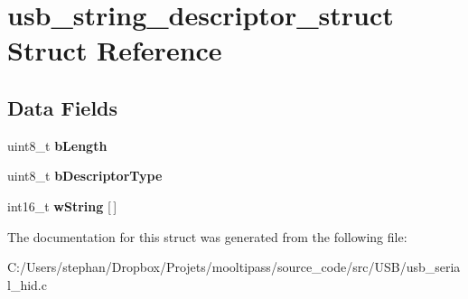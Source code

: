 \hypertarget{structusb__string__descriptor__struct}{\section{usb\-\_\-string\-\_\-descriptor\-\_\-struct Struct Reference}
\label{structusb__string__descriptor__struct}
}
\subsection*{Data Fields}
\begin{DoxyCompactItemize}
\item 
\hypertarget{structusb__string__descriptor__struct_a1deca1f1d6e5815b290e6e1015bce5b8}{uint8\-\_\-t {\bfseries b\-Length}}\label{structusb__string__descriptor__struct_a1deca1f1d6e5815b290e6e1015bce5b8}

\item 
\hypertarget{structusb__string__descriptor__struct_a67d7027b9eb9ed268d28e84fbc675707}{uint8\-\_\-t {\bfseries b\-Descriptor\-Type}}\label{structusb__string__descriptor__struct_a67d7027b9eb9ed268d28e84fbc675707}

\item 
\hypertarget{structusb__string__descriptor__struct_a73b6a1a52dd1abac3cef0d39a6e340a5}{int16\-\_\-t {\bfseries w\-String} \mbox{[}$\,$\mbox{]}}\label{structusb__string__descriptor__struct_a73b6a1a52dd1abac3cef0d39a6e340a5}

\end{DoxyCompactItemize}


The documentation for this struct was generated from the following file\-:\begin{DoxyCompactItemize}
\item 
C\-:/\-Users/stephan/\-Dropbox/\-Projets/mooltipass/source\-\_\-code/src/\-U\-S\-B/usb\-\_\-serial\-\_\-hid.\-c\end{DoxyCompactItemize}
